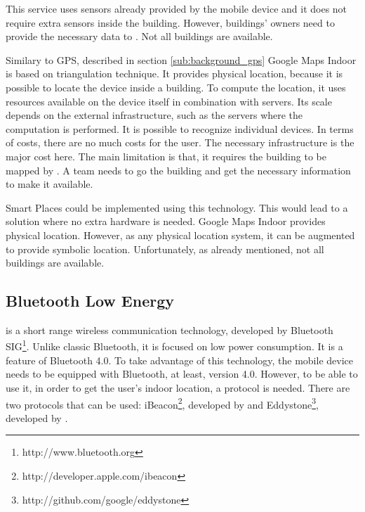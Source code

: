 This service uses sensors already provided by the mobile device and it does not require extra sensors inside the building.
However, buildings' owners need to provide the necessary data to .
Not all buildings are available.

Similary to \gls{GPS}, described in section \ref{sub:background_gps} Google Maps Indoor is based on triangulation technique.
It provides physical location, because it is possible to locate the device inside a building.
To compute the location, it uses resources available on the device itself in combination with servers.
Its scale depends on the external infrastructure, such as the servers where the computation is performed.
It is possible to recognize individual devices.
In terms of costs, there are no much costs for the user. The necessary infrastructure is the major cost here.
The main limitation is that, it requires the building to be mapped by . A team needs to go the building and get the necessary information to make it available.

Smart Places could be implemented using this technology.
This would lead to a solution where no extra hardware is needed.
Google Maps Indoor provides physical location. However, as any physical location system, it can be augmented to provide symbolic location.
Unfortunately, as already mentioned, not all buildings are available.

\subsection{Bluetooth Low Energy}
\label{sub:background_bluetooth_low_energy}
\cite{ble} is a short range wireless communication technology, developed by Bluetooth \gls{SIG}\footnote{http://www.bluetooth.org}.
Unlike classic Bluetooth, it is focused on low power consumption.
It is a feature of Bluetooth 4.0\cite{bluetooth_specification}.
To take advantage of this technology, the mobile device needs to be equipped with Bluetooth, at least, version 4.0.
However, to be able to use it, in order to get the user's indoor location, a protocol is needed.
There are two protocols that can be used: iBeacon\footnote{http://developer.apple.com/ibeacon}, developed by  and Eddystone\footnote{http://github.com/google/eddystone}, developed by .

